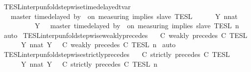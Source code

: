 \begin{isabellebody}
%
\endisadelimproof
\isanewline
{}\isamarkupfalse%
\ TESL{\isacharunderscore}interp{\isacharunderscore}unfold{\isacharunderscore}stepwise{\isacharunderscore}timedelayed{\isacharunderscore}tvar{\isacharcolon}\isanewline
\ \ {\isacartoucheopen}{\isasymlbrakk}\ master\ time{\isacharminus}delayed{\isasymbowtie}\ by\ {\isasymdelta}{\isasymtau}\ on\ measuring\ implies\ slave\ {\isasymrbrakk}\isactrlsub T\isactrlsub E\isactrlsub S\isactrlsub L\isanewline
\ \ \ \ {\isacharequal}\ {\isasymInter}\ {\isacharbraceleft}Y{\isachardot}\ {\isasymexists}n{\isacharcolon}{\isacharcolon}nat{\isachardot}\isanewline
\ \ \ \ \ \ \ \ \ \ Y\ {\isacharequal}\ {\isasymlbrakk}\ master\ time{\isacharminus}delayed{\isasymbowtie}\ by\ {\isasymdelta}{\isasymtau}\ on\ measuring\ implies\ slave\ {\isasymrbrakk}\isactrlsub T\isactrlsub E\isactrlsub S\isactrlsub L\isactrlbsup {\isasymge}\ n\isactrlesup {\isacharbraceright}{\isacartoucheclose}\isanewline
%
\isadelimproof
%
\endisadelimproof
%
\isatagproof
{}\isamarkupfalse%
\ auto%
\endisatagproof
{\isafoldproof}%
%
\isadelimproof
\isanewline
%
\endisadelimproof
\isanewline
{}\isamarkupfalse%
\ TESL{\isacharunderscore}interp{\isacharunderscore}unfold{\isacharunderscore}stepwise{\isacharunderscore}weakly{\isacharunderscore}precedes{\isacharcolon}\isanewline
\ \ {\isacartoucheopen}{\isasymlbrakk}\ C\ weakly\ precedes\ C\ {\isasymrbrakk}\isactrlsub T\isactrlsub E\isactrlsub S\isactrlsub L\isanewline
\ \ \ \ {\isacharequal}\ {\isasymInter}\ {\isacharbraceleft}Y{\isachardot}\ {\isasymexists}n{\isacharcolon}{\isacharcolon}nat{\isachardot}\ Y\ {\isacharequal}\ {\isasymlbrakk}\ C\ weakly\ precedes\ C\ {\isasymrbrakk}\isactrlsub T\isactrlsub E\isactrlsub S\isactrlsub L\isactrlbsup {\isasymge}\ n\isactrlesup {\isacharbraceright}{\isacartoucheclose}\isanewline
%
\isadelimproof
%
\endisadelimproof
%
\isatagproof
{}\isamarkupfalse%
\ auto%
\endisatagproof
{\isafoldproof}%
%
\isadelimproof
\isanewline
%
\endisadelimproof
\isanewline
{}\isamarkupfalse%
\ TESL{\isacharunderscore}interp{\isacharunderscore}unfold{\isacharunderscore}stepwise{\isacharunderscore}strictly{\isacharunderscore}precedes{\isacharcolon}\isanewline
\ \ {\isacartoucheopen}{\isasymlbrakk}\ C\ strictly\ precedes\ C\ {\isasymrbrakk}\isactrlsub T\isactrlsub E\isactrlsub S\isactrlsub L\isanewline
\ \ \ \ {\isacharequal}\ {\isasymInter}\ {\isacharbraceleft}Y{\isachardot}\ {\isasymexists}n{\isacharcolon}{\isacharcolon}nat{\isachardot}\ Y\ {\isacharequal}\ {\isasymlbrakk}\ C\ strictly\ precedes\ C\ {\isasymrbrakk}\isactrlsub T\isactrlsub E\isactrlsub S\isactrlsub L\isactrlbsup {\isasymge}\ n\isactrlesup {\isacharbraceright}{\isacartoucheclose}\isanewline

\end{isabellebody}
